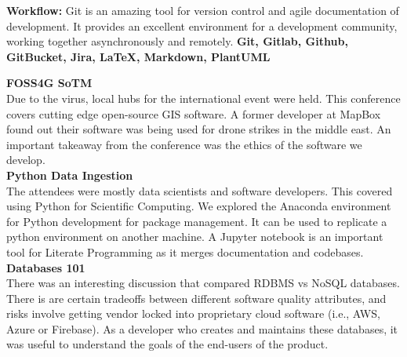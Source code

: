 \documentclass[9pt]{developercv}
\begin{document}
\textbf{Workflow:} Git is an amazing tool for version control and agile documentation of development. It provides an excellent environment for a development community, working together asynchronously and remotely. \textbf{Git, Gitlab, Github, GitBucket, Jira, LaTeX, Markdown, PlantUML}



\textbf{FOSS4G SoTM} \\
Due to the virus, local hubs for the international event were held. This conference covers cutting edge open-source GIS software. A former developer at MapBox found out their software was being used for drone strikes in the middle east. An important takeaway from the conference was the ethics of the software we develop. \\

\textbf{Python Data Ingestion} \\
The attendees were mostly data scientists and software developers. This covered using Python for Scientific Computing. We explored the Anaconda environment for Python development for package management. It can be used to replicate a python environment on another machine. A Jupyter notebook is an important tool for Literate Programming as it merges documentation and codebases. \\

\textbf{Databases 101} \\
There was an interesting discussion that compared RDBMS vs NoSQL databases. There is are certain tradeoffs between different software quality attributes, and risks involve getting vendor locked into proprietary cloud software (i.e., AWS, Azure or Firebase). As a developer who creates and maintains these databases, it was useful to understand the goals of the end-users of the product.

\end{document}
